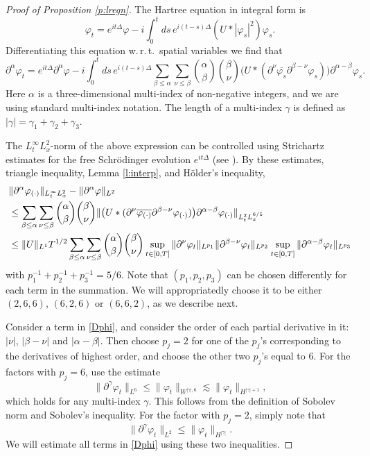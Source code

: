 \documentclass[11pt,a4paper,draft,DIV11]{scrartcl}	%
\begin{document}
\begin{proof}[Proof of Proposition \ref{p:lregn}]
  The Hartree equation in integral form is
  \[
    \varphi_t = e^{it\Delta} \varphi - i \int_0^t ds \, e^{i(t-s)\Delta} (U *
    |\varphi_s|^2) \varphi_s.
  \]
  Differentiating this equation w.\,r.\,t.\ spatial variables we find that
  \[
    \partial^\alpha \varphi_t = e^{it \Delta} \partial^\alpha \varphi - i
    \int_0^t ds \, e^{i(t-s) \Delta} \sum_{\beta \le \alpha} \sum_{\nu \le
    \beta} \binom{\alpha}{\beta} \binom{\beta}{\nu} \big( U * (\partial^\nu
    \overline{\varphi_s} \partial^{\beta - \nu} \varphi_s) \big)
    \partial^{\alpha - \beta} \varphi_s.
  \]
  Here $\alpha$ is a three-dimensional multi-index of non-negative integers,
  and we are using standard multi-index notation. The length of a multi-index
  $\gamma$ is defined as $|\gamma| = \gamma_1 + \gamma_2 + \gamma_3$.


  The $L_t^\infty L_x^2$-norm of the above expression can be controlled using
  Strichartz estimates for the free Schr\"odinger evolution $e^{it\Delta}$
  (see \cite[Theorem 1.2]{KT}). By these estimates, triangle inequality, Lemma
  \ref{l:interp}, and H\"older's inequality,
  \begin{align}
    & \| \partial^\alpha \varphi_{(\cdot)} \|_{L_t^\infty L_x^2} - \|
    \partial^\alpha \varphi \|_{L^2} \notag \\
    & \le \sum_{\beta \le \alpha} \sum_{\nu \le \beta} \binom{\alpha}{\beta}
    \binom{\beta}{\nu} \| \big( U * (\partial^\nu
    \overline{\varphi_{(\cdot)}} \partial^{\beta - \nu} \varphi_{(\cdot)})
    \big) \partial^{\alpha - \beta} \varphi_{(\cdot)} \|_{L_t^2 L_x^{6/5}}
    \notag \\
    & \le \| U \|_{L^1} T^{1/2} \sum_{\beta \le \alpha} \sum_{\nu \le \beta}
    \binom{\alpha}{\beta} \binom{\beta}{\nu} \sup_{t \in [0,T]} \|
    \partial^\nu \varphi_t \|_{L^{p_1}} \| \partial^{\beta - \nu} \varphi_t
    \|_{L^{p_2}} \sup_{t \in [0,T]} \| \partial^{\alpha - \beta} \varphi_t
    \|_{L^{p_3}} \label{Dphi}
  \end{align}
  with $p_1^{-1} + p_2^{-1} + p_3^{-1} = 5/6$. Note that $(p_1, p_2, p_3)$ can
  be chosen differently for each term in the summation. We will appropriatedly
  choose it to be either $(2,6,6)$, $(6,2,6)$ or $(6,6,2)$, as we describe
  next.


  Consider a term in \eqref{Dphi}, and consider the order of each partial
  derivative in it: $|\nu|$, $|\beta-\nu|$ and $|\alpha-\beta|$. Then choose
  $p_j = 2$ for one of the $p_j$'s corresponding to the derivatives of highest
  order, and choose the other two $p_j$'s equal to $6$. For the factors with
  $p_j = 6$, use the estimate
  \[
    \| \partial^\gamma \varphi_t \|_{L^6} \le \| \varphi_t \|_{W^{|\gamma|,6}}
    \apprle \| \varphi_t \|_{H^{|\gamma|+1}},
  \]
  which holds for any multi-index $\gamma$. This follows from the definition
  of Sobolev norm and Sobolev's inequality. For the factor with $p_j = 2$,
  simply note that
  \[
    \| \partial^\gamma \varphi_t \|_{L^2} \le \| \varphi_t \|_{H^{|\gamma|}}.
  \]
  We will estimate all terms in \eqref{Dphi} using these two inequalities.



\end{proof}
\end{document}
